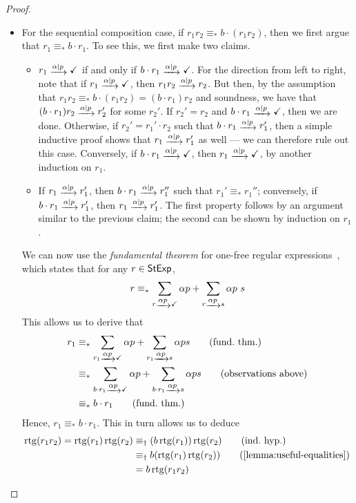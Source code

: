 \documentclass[orivec,envcountsect,envcountsame]{llncs}
\begin{document}
\begin{proof}
\begin{itemize}
		\item For the sequential composition case, if \(r_1r_2 \equiv_*b\cdot (r_1 r_2)\), then we first argue that \(r_1 \equiv_* b\cdot r_1\).
		To see this, we first make two claims.
        \begin{itemize}
            \item
            \(r_1 \tr{\alpha \mid p} \checkmark\) if and only if \(b \cdot r_1 \tr{\alpha \mid p} \checkmark\).
            For the direction from left to right, note that if \(r_1 \tr{\alpha \mid p} \checkmark\), then \(r_1r_2 \tr{\alpha \mid p} r_2\).
            But then, by the assumption that \(r_1r_2 \equiv_* b \cdot (r_1r_2) = (b \cdot r_1)r_2\) and soundness, we have that \((b \cdot r_1)r_2 \tr{\alpha \mid p} r_2'\) for some \(r_2'\).
            If \(r_2' = r_2\) and \(b \cdot r_1 \tr{\alpha \mid p} \checkmark\), then we are done.
            Otherwise, if \(r_2' = r_1' \cdot r_2\) such that \(b \cdot r_1 \tr{\alpha \mid p} r_1'\), then a simple inductive proof shows that \(r_1 \tr{\alpha \mid p} r_1'\) as well --- we can therefore rule out this case.
            Conversely, if \(b \cdot r_1 \tr{\alpha \mid p} \checkmark\), then \(r_1 \tr{\alpha \mid p} \checkmark\), by another induction on \(r_1\).
            \item
            If \(r_1 \tr{\alpha \mid p} r_1'\), then \(b \cdot r_1 \tr{\alpha \mid p} r_1''\) such that \(r_1' \equiv_* r_1''\); conversely, if \(b \cdot r_1 \tr{\alpha \mid p} r_1'\), then \(r_1 \tr{\alpha\mid p} r_1'\).
            The first property follows by an argument similar to the previous claim; the second can be shown by induction on \(r_1\).
        \end{itemize}

		We can now use the \emph{fundamental theorem} for one-free regular expressions~\cite[Proposition 2.9]{regexlics}, which states that for any \(r \in \mathsf{StExp}\),
		\begin{equation}\label{eq:fundamental theorem}
			r \equiv_* \sum_{r \tr{\alpha p} \checkmark} \alpha p + \sum_{r \tr{\alpha p} s} \alpha p~s
		\end{equation}
		This allows us to derive that
		\begin{align*}
			r_1
			&\equiv_* \sum_{r_1 \tr{\alpha p} \checkmark} \alpha p + \sum_{r_1 \tr{\alpha p} s} \alpha p s \tag{fund.~thm.} \\
			&\equiv_* \sum_{b\cdot r_1 \tr{\alpha p} \checkmark} \alpha p + \sum_{b\cdot r_1 \tr{\alpha p} s} \alpha p s \tag{observations above} \\
			&\equiv_* b\cdot r_1 \tag{fund.~thm.}
		\end{align*}
		Hence, \(r_1 \equiv_*b \cdot r_1\).
		This in turn allows us to deduce
		\begin{align*}
			\rtg(r_1r_2)
			= \rtg(r_1)\rtg(r_2)
			&\equiv_\dagger (b\rtg(r_1))\rtg(r_2) \tag{ind.~hyp.}\\
			&\equiv_\dagger b(\rtg(r_1)\rtg(r_2)) \tag{\cref{lemma:useful-equalities}} \\
			&= b\rtg(r_1r_2)
		\end{align*}


\end{itemize}
\end{proof}
\end{document}
